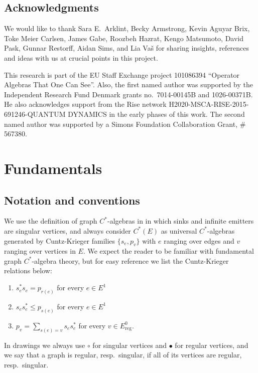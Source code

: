 \documentclass[12pt]{amsbook}%
\theoremstyle{defin}
\theoremstyle{remark}
\numberwithin{equation}{chapter}
\numberwithin{theor}{section}
\begin{document}
\subsection{Acknowledgments}

We would like to thank Sara E.~Arklint, Becky Armstrong, Kevin Aguyar Brix, Toke Meier Carlsen, James Gabe, Roozbeh Hazrat, Kengo Matsumoto, David Pask, Gunnar Restorff, Aidan Sims, and Lia Va\v s for sharing insights, references and ideas with us at crucial points in this project.

This research is part of the EU Staff Exchange project 101086394 ``Operator Algebras That
One Can See''. Also, the first named author was supported by the Independent Research Fund Denmark 
grants no.\ 7014-00145B and 1026-00371B.  He also acknowledges support from the Rise network H2020-MSCA-RISE-2015-691246-QUANTUM DYNAMICS in the early phases of this work. The second named author was supported by
a Simons Foundation Collaboration Grant, \# 567380. 

\section{Fundamentals}

\subsection{Notation and conventions}

We use the definition of graph $C^*$-algebras in \cite{njfmlir:cig} in which sinks and infinite emitters are singular vertices, and always consider $C^*(E)$ as universal $C^*$-algebras generated by Cuntz-Krieger families $\{s_e,p_v\}$ with $e$ ranging over edges and $v$ ranging over vertices in $E$.  We expect the reader to be familiar with fundamental graph $C^*$-algebra theory, but for easy reference we list the Cuntz-Krieger relations below:
\begin{enumerate}[(CK1)]
\item $s_e^* s_e = p_{r(e)}$ for every $e\in E^1$
\item $s_e s_e^* \leq p_{s(e)}$ for every $e\in E^1$
\item $ p_v = \sum_{s(e)=v} s_e s_e^*$ for every $v\in E^0_{\text{reg}}$.
\end{enumerate}
In drawings we always use $\circ$ for singular vertices and $\bullet$ for regular vertices, and we say that a graph is regular, resp.~singular, if all of its vertices are regular, resp.~singular.     
\end{document}
